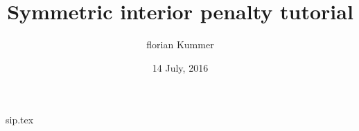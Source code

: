 \documentclass[10pt,a4paper]{article}
\title{Symmetric interior penalty tutorial}
\date{14 July, 2016}
\author{florian Kummer}
\begin{document}
\maketitle

{sip.tex}
\end{document}
